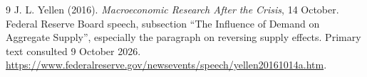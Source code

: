 \documentclass[11pt]{article}
\theoremstyle{remark}
\begin{document}
\begin{thebibliography}{9}
 J. L. Yellen (2016).
\emph{Macroeconomic Research After the Crisis}, 14 October.
Federal Reserve Board speech, subsection ``The Influence of Demand on
Aggregate Supply'', especially the paragraph on reversing supply effects.
Primary text consulted 9 October 2026.
\url{https://www.federalreserve.gov/newsevents/speech/yellen20161014a.htm}.
\end{thebibliography}
\end{document}
